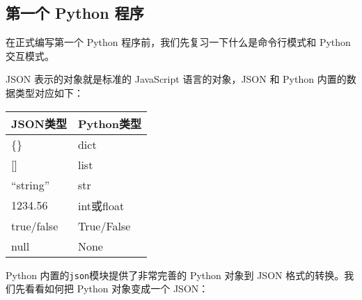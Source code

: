 \hypertarget{ux7b2cux4e00ux4e2a-python-ux7a0bux5e8f}{%
\subsection{第一个 Python
程序}\label{ux7b2cux4e00ux4e2a-python-ux7a0bux5e8f}}

在正式编写第一个 Python 程序前，我们先复习一下什么是命令行模式和 Python
交互模式。

JSON 表示的对象就是标准的 JavaScript 语言的对象，JSON 和 Python
内置的数据类型对应如下：

\begin{longtable}[]{@{}ll@{}}
\toprule
JSON类型 & Python类型\tabularnewline
\midrule
\endhead
\{\} & dict\tabularnewline
{[}{]} & list\tabularnewline
``string'' & str\tabularnewline
1234.56 & int或float\tabularnewline
true/false & True/False\tabularnewline
null & None\tabularnewline
\bottomrule
\end{longtable}

Python 内置的\texttt{json}模块提供了非常完善的 Python 对象到 JSON
格式的转换。我们先看看如何把 Python 对象变成一个 JSON：
